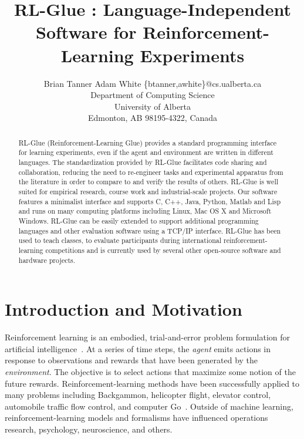 \documentclass[twoside,11pt]{article}
\begin{document}
\title{RL-Glue : Language-Independent Software for Reinforcement-Learning Experiments}


\author{\name Brian Tanner \AND Adam White  \email \{btanner,awhite\}@cs.ualberta.ca \\
       \addr Department of Computing Science\\
       University of Alberta\\
       Edmonton, AB 98195-4322, Canada}


\maketitle

\begin{abstract}%
RL-Glue (Reinforcement-Learning Glue) provides a standard programming interface for learning experiments, even if the agent and environment are written in different languages. 
The standardization provided by RL-Glue facilitates code sharing and collaboration, reducing the need to re-engineer tasks and experimental apparatus from the literature in order to compare to and verify the results of others.
RL-Glue is well suited for empirical research, course work and industrial-scale projects. Our software features a minimalist interface and supports C, C++, Java, Python, Matlab and Lisp and runs on many computing platforms including Linux, Mac OS X and Microsoft Windows. RL-Glue can be easily extended to support additional programming languages and other evaluation software using a TCP/IP interface. RL-Glue has been used to teach classes, to evaluate participants during international reinforcement-learning competitions and is currently used by several other open-source software and hardware projects.
\end{abstract}

\section{Introduction and Motivation}
Reinforcement learning is an embodied, trial-and-error problem formulation for artificial intelligence~\citep{rlbook, rlsurvey,ndp}.  At a series of time steps, the {\it agent} emits actions in response to observations and rewards that have been generated by the {\it environment}.  The objective is to select actions that maximize some notion of the future rewards.  Reinforcement-learning methods have been successfully applied to many problems including Backgammon, helicopter flight, elevator control, automobile traffic flow control, and computer Go~\citep{rlbook}. Outside of machine learning, reinforcement-learning models and formalisms have influenced operations research, psychology, neuroscience, and others.
\end{document}
